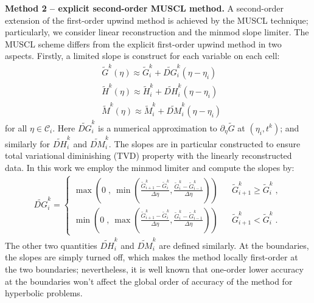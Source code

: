 \documentclass{amsart}
\theoremstyle{definition}
\theoremstyle{remark}
\numberwithin{equation}{section}
\numberwithin{figure}{section}
\begin{document}
\noindent
{\bf Method 2 -- explicit second-order MUSCL method.}
A second-order extension of the first-order upwind method is achieved by the MUSCL technique; particularly, we consider linear reconstruction and the minmod slope limiter.
The MUSCL scheme differs from the explicit first-order upwind method in two aspects.
Firstly, a limited slope is construct for each variable on each cell:
\begin{align*}
&\tilde{G}^k(\eta) \approx \tilde{G}^k_i + \widetilde{DG}^k_i(\eta-\eta_i) \\
&\tilde{H}^k(\eta) \approx \tilde{H}^k_i + \widetilde{DH}^k_i(\eta-\eta_i) \\
&\tilde{M}^k(\eta) \approx \tilde{M}^k_i + \widetilde{DM}^k_i(\eta-\eta_i)
\end{align*}
for all $\eta\in\mathcal{C}_i$.
Here $\widetilde{DG}^k_i$ is a numerical approximation to $\partial_{\eta}\tilde{G}$ at $(\eta_i,t^k)$; and similarly for $\widetilde{DH}^k_i$ and $\widetilde{DM}^k_i$.
The slopes are in particular constructed to ensure total variational diminishing (TVD) property with the linearly reconstructed data.
In this work we employ the minmod limiter and compute the slopes by:
\begin{align*}
\widetilde{DG}^k_i = \left\{\begin{array}{lcl}
\max\left(0\;,\ \min\left(\frac{\tilde{G}^k_{i+1}-\tilde{G}^k_i}{\Delta\eta} , \frac{\tilde{G}^k_i-\tilde{G}^k_{i-1}}{\Delta\eta}\right)\right) & & \tilde{G}^k_{i+1}\ge\tilde{G}^k_i\;, \\
\min\left(0\;,\ \max\left(\frac{\tilde{G}^k_{i+1}-\tilde{G}^k_i}{\Delta\eta} , \frac{\tilde{G}^k_i-\tilde{G}^k_{i-1}}{\Delta\eta}\right)\right) & & \tilde{G}^k_{i+1}<\tilde{G}^k_i\;.
\end{array}\right.
\end{align*}
The other two quantities $\widetilde{DH}^k_i$ and $\widetilde{DM}^k_i$ are defined similarly.
At the boundaries, the slopes are simply turned off, which makes the method locally first-order at the two boundaries; nevertheless, it is well known that one-order lower accuracy at the boundaries won't affect the global order of accuracy of the method for hyperbolic problems.
\end{document}
